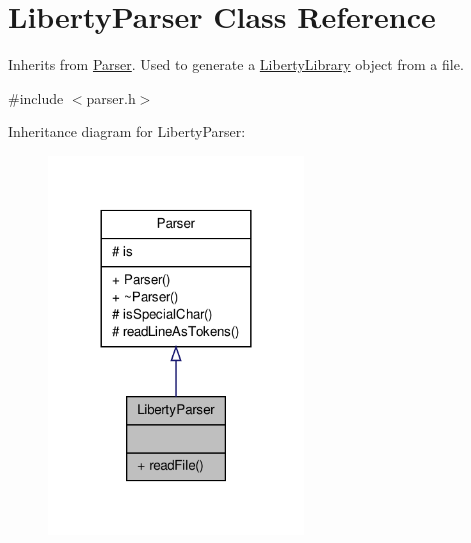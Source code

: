 \hypertarget{classLibertyParser}{\section{Liberty\-Parser Class Reference}
\label{classLibertyParser}
}


Inherits from \hyperlink{classParser}{Parser}. Used to generate a \hyperlink{classLibertyLibrary}{Liberty\-Library} object from a file.  




{\ttfamily \#include $<$parser.\-h$>$}



Inheritance diagram for Liberty\-Parser\-:\nopagebreak
\begin{figure}[H]
\begin{center}
\leavevmode
\includegraphics[width=192pt]{classLibertyParser__inherit__graph}
\end{center}
\end{figure}


